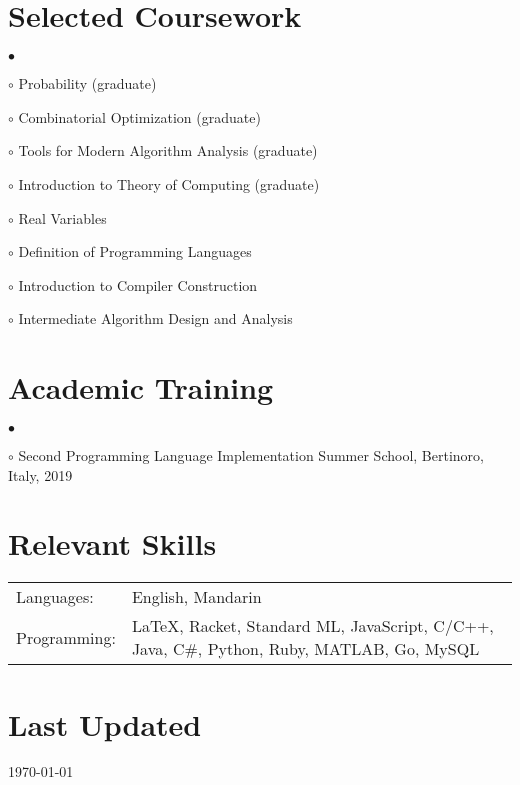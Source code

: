 \documentclass[margin,line]{res}
\newenvironment{list2}{
  \begin{list}{$\bullet$}{%
      \setlength{\itemsep}{0in}
      \setlength{\parsep}{0in} \setlength{\parskip}{0in}
      \setlength{\topsep}{0in} \setlength{\partopsep}{0in}
      \setlength{\leftmargin}{0.2in}}}{\end{list}}
\begin{document}
\begin{resume}
\section{\sc Selected Coursework}

\begin{list2}
\item[$\circ$] Probability (graduate)
\item[$\circ$] Combinatorial Optimization (graduate)
\item[$\circ$] Tools for Modern Algorithm Analysis (graduate)
\item[$\circ$] Introduction to Theory of Computing (graduate)
\item[$\circ$] Real Variables
\item[$\circ$] Definition of Programming Languages
\item[$\circ$] Introduction to Compiler Construction
\item[$\circ$] Intermediate Algorithm Design and Analysis
\end{list2}


\section{\sc Academic Training}

\begin{list2}
\item[$\circ$] Second Programming Language Implementation Summer School, Bertinoro, Italy, 2019
\end{list2}


\section{\sc Relevant Skills}

\vspace{.05in}
\begin{tabular}{@{}p{0.8in}p{4.25in}}

Languages:& English, Mandarin \\
Programming:& \LaTeX, Racket, Standard ML, JavaScript, C/C++, Java, C\#, Python, Ruby, MATLAB, Go, MySQL

\end{tabular}


\section{\sc Last Updated}
\today


\end{resume}
\end{document}

